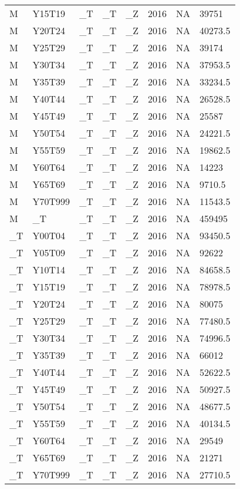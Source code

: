 \begin{longtable}[t]{llllllll}
M & Y15T19 & \_T & \_T & \_Z & 2016 & NA & 39751\\
M & Y20T24 & \_T & \_T & \_Z & 2016 & NA & 40273.5\\
M & Y25T29 & \_T & \_T & \_Z & 2016 & NA & 39174\\
M & Y30T34 & \_T & \_T & \_Z & 2016 & NA & 37953.5\\
\addlinespace
M & Y35T39 & \_T & \_T & \_Z & 2016 & NA & 33234.5\\
M & Y40T44 & \_T & \_T & \_Z & 2016 & NA & 26528.5\\
M & Y45T49 & \_T & \_T & \_Z & 2016 & NA & 25587\\
M & Y50T54 & \_T & \_T & \_Z & 2016 & NA & 24221.5\\
M & Y55T59 & \_T & \_T & \_Z & 2016 & NA & 19862.5\\
\addlinespace
M & Y60T64 & \_T & \_T & \_Z & 2016 & NA & 14223\\
M & Y65T69 & \_T & \_T & \_Z & 2016 & NA & 9710.5\\
M & Y70T999 & \_T & \_T & \_Z & 2016 & NA & 11543.5\\
M & \_T & \_T & \_T & \_Z & 2016 & NA & 459495\\
\_T & Y00T04 & \_T & \_T & \_Z & 2016 & NA & 93450.5\\
\addlinespace
\_T & Y05T09 & \_T & \_T & \_Z & 2016 & NA & 92622\\
\_T & Y10T14 & \_T & \_T & \_Z & 2016 & NA & 84658.5\\
\_T & Y15T19 & \_T & \_T & \_Z & 2016 & NA & 78978.5\\
\_T & Y20T24 & \_T & \_T & \_Z & 2016 & NA & 80075\\
\_T & Y25T29 & \_T & \_T & \_Z & 2016 & NA & 77480.5\\
\addlinespace
\_T & Y30T34 & \_T & \_T & \_Z & 2016 & NA & 74996.5\\
\_T & Y35T39 & \_T & \_T & \_Z & 2016 & NA & 66012\\
\_T & Y40T44 & \_T & \_T & \_Z & 2016 & NA & 52622.5\\
\_T & Y45T49 & \_T & \_T & \_Z & 2016 & NA & 50927.5\\
\_T & Y50T54 & \_T & \_T & \_Z & 2016 & NA & 48677.5\\
\addlinespace
\_T & Y55T59 & \_T & \_T & \_Z & 2016 & NA & 40134.5\\
\_T & Y60T64 & \_T & \_T & \_Z & 2016 & NA & 29549\\
\_T & Y65T69 & \_T & \_T & \_Z & 2016 & NA & 21271\\
\_T & Y70T999 & \_T & \_T & \_Z & 2016 & NA & 27710.5\\

\end{longtable}
